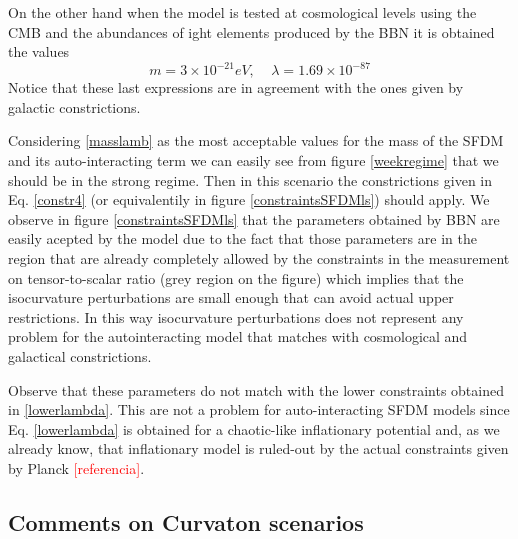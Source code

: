 \documentclass[amssymb,twocolumn,prd,nofootinbib,showpacs]{revtex4-1}
\begin{document}
On the other hand when the model is tested at cosmological levels using the CMB and the abundances of ight elements produced by the BBN it is obtained the values \cite{SFphi41,SFphi42}
\begin{equation}\label{masslamb}
m=3\times 10^{-21}eV, \ \ \ \ \ \lambda = 1.69\times 10^{-87}
\end{equation}
Notice that these last expressions are in agreement with the ones given by galactic constrictions.

Considering \eqref{masslamb} as the most acceptable values for the mass of the SFDM and its auto-interacting term we can easily see from figure \ref{weekregime} that we should be in the strong regime. Then in this scenario the constrictions given in Eq. \eqref{constr4} (or equivalentily in figure \ref{constraintsSFDMls}) should apply. We observe in figure \ref{constraintsSFDMls} that the parameters obtained by BBN are easily acepted by the model due to the fact that those parameters are in the region that are already completely allowed by the constraints in the measurement on tensor-to-scalar ratio (grey region on the figure) which implies that the isocurvature perturbations are small enough that can avoid actual upper restrictions. In this way isocurvature perturbations does not represent any problem for the autointeracting model that matches with cosmological and galactical constrictions.

Observe that these parameters do not match with the lower constraints obtained in \eqref{lowerlambda}. This are not a problem for auto-interacting SFDM models since Eq. \eqref{lowerlambda} is obtained for a chaotic-like inflationary potential and, as we already know, that inflationary model is ruled-out by the actual constraints given by Planck \textcolor{red}{[referencia]}.

\subsection{Comments on Curvaton scenarios}
\end{document}
